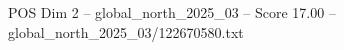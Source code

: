 \begin{textsample}{POS Dim 2 – global\_north\_2025\_03 – Score 17.00 – global\_north\_2025\_03/122670580.txt}
\end{textsample}

